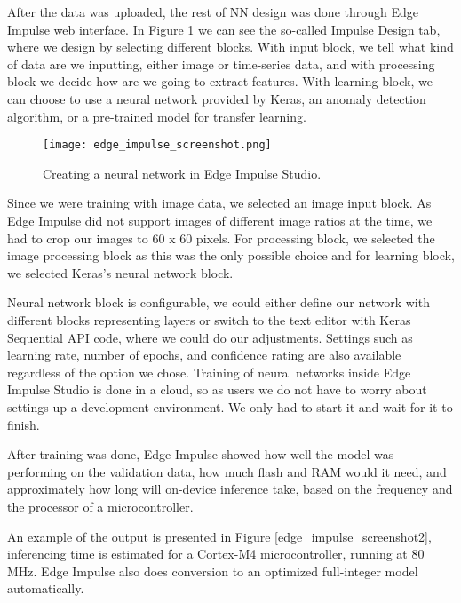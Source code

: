 
After the data was uploaded, the rest of NN design was done through Edge Impulse web interface.
In Figure \ref{edge_impulse_screenshot} we can see the so-called Impulse Design tab, where we design by selecting different blocks.
With input block, we tell what kind of data are we inputting, either image or time-series data, and with processing block we decide how are we going to extract features.
With learning block, we can choose to use a neural network provided by Keras, an anomaly detection algorithm, or a pre-trained model for transfer learning.

\begin{figure}[ht]
    \centering
    \texttt{[image: edge\_impulse\_screenshot.png]} 
    \caption{Creating a neural network in Edge Impulse Studio.}
    \label{edge_impulse_screenshot}
\end{figure}

Since we were training with image data, we selected an image input block. As Edge Impulse did not support images of different image ratios at the time, we had to crop our images to 60 x 60 pixels.
For processing block, we selected the image processing block as this was the only possible choice and for learning block, we selected Keras's neural network block.

Neural network block is configurable, we could either define our network with different blocks representing layers or switch to the text editor with Keras Sequential API code, where we could do our adjustments.
Settings such as learning rate, number of epochs, and confidence rating are also available regardless of the option we chose.
Training of neural networks inside Edge Impulse Studio is done in a cloud, so as users we do not have to worry about settings up a development environment.
We only had to start it and wait for it to finish.

After training was done, Edge Impulse showed how well the model was performing on the validation data, how much flash and RAM would it need, and approximately how long will on-device inference take, based on the frequency and the processor of a microcontroller.

An example of the output is presented in Figure \ref{edge_impulse_screenshot2}, inferencing time is estimated for a Cortex-M4 microcontroller, running at 80 \si{\mega\hertz}.
Edge Impulse also does conversion to an optimized full-integer model automatically.

